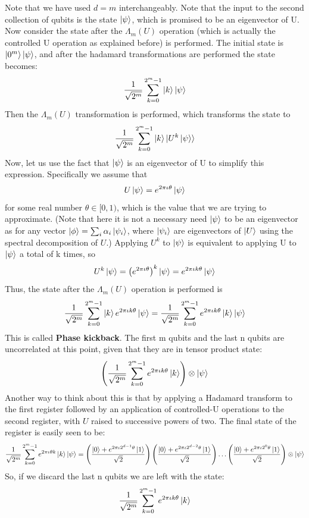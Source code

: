 Note that we have used $d=m$ interchangeably. Note that the input to the second collection of qubits is the state $\ket{\psi}$, which is promised to be an eigenvector of U.
Now consider the state after the $\Lambda_m(U)$ operation (which is actually the controlled U operation as explained before) is performed. The initial state is $\ket{0^m}\ket{\psi}$, and after the hadamard transformations are performed the state becomes:
\[
\frac{1}{\sqrt{2^m}}\sum_{k=0}^{2^m-1}\ket{k}\ket{\psi}
\]
Then the $\Lambda_m(U)$ transformation is performed, which transforms the state to
\[
\frac{1}{\sqrt{2^m}}\sum_{k=0}^{2^m-1}\ket{k}\ket{U^k\ket{\psi}}
\]
Now, let us use the fact that $\ket{\psi}$ is an eigenvector of U to simplify this expression. Specifically we assume that 
\[
U\ket{\psi}=e^{2\pi\iota \theta}\ket{\psi}
\]
for some real number $\theta \in [0,1)$, which is the value that we are trying to approximate. (Note that here it is not a necessary need $\ket{\psi}$ to be an eigenvector as for any vector $\ket{\phi} = \sum_i \alpha_i \ket{\psi_i}$, where $\ket{\psi_i}$ are eigenvectors of $\ket{U}$ using the spectral decomposition of $U$.)
Applying $U^k$ to $\ket{\psi}$ is equivalent to applying U to $\ket{\psi}$ a total of k times, so
\[
U^k\ket{\psi}=\left(e^{2\pi\iota \theta}\right)^k\ket{\psi}=e^{2\pi\iota k\theta}\ket{\psi}
\]
Thus, the state after the $\Lambda_m(U)$ operation is performed is
\[
\frac{1}{\sqrt{2^m}}\sum_{k=0}^{2^m-1}\ket{k}e^{2\pi\iota k\theta}\ket{\psi}=\frac{1}{\sqrt{2^m}}\sum_{k=0}^{2^m-1}e^{2\pi\iota k\theta}\ket{k}\ket{\psi}
\]
This is called \textbf{Phase kickback}. The first m qubits and the last n qubits are uncorrelated at this point, given that they are in tensor product state:
\[
\left(\frac{1}{\sqrt{2^m}}\sum_{k=0}^{2^m-1}e^{2\pi\iota k\theta}\ket{k}\right)\otimes\ket{\psi}
\]
Another way to think about this is that by applying a Hadamard transform to the first register followed by an application of controlled-U operations to the second register, with $U$ raised to successive powers of two. The final state of the register is easily seen to be:
\[
\frac{1}{\sqrt{2^m}}\sum_{k=0}^{2^m-1} e^{2\pi\iota \theta k }\ket{k}\ket{\psi}
=\left(\frac{\ket{0}+e^{2\pi\iota 2^{d-1}\theta}\ket{1}}{\sqrt{2}}\right)\left(\frac{\ket{0}+e^{2\pi\iota 2^{d-2}\theta}\ket{1}}{\sqrt{2}}\right)\ldots\left(\frac{\ket{0}+e^{2\pi\iota 2^0\theta}\ket{1}}{\sqrt{2}}\right) \otimes \ket{\psi}
\]
So, if we discard the last n qubits we are left with the state:
\[
\frac{1}{\sqrt{2^m}}\sum_{k=0}^{2^m-1}e^{2\pi\iota k\theta}\ket{k}
\]

